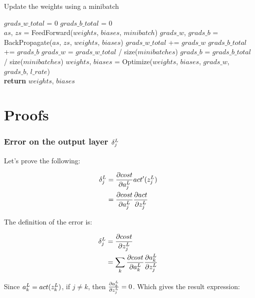 \documentclass[a4paper]{article}
\begin{document}
\begin{algorithm}
  \caption{Update the weights using a minibatch}
  \begin{algorithmic}
      \State $grads\_w\_total$ = $0$
      \State $grads\_b\_total$ = $0$ \\

        \State $as$, $zs$ = FeedForward($weights$, $biases$, $minibatch$)
        \State $grads\_w$, $grads\_b$ = BackPropagate($as$, $zs$, $weights$, $biases$)
        \State $grads\_w\_total$ += $grads\_w$
        \State $grads\_b\_total$ += $grads\_b$
      \EndFor
      \State $grads\_w$ = $grads\_w\_total$ / size($minibatches$)
      \State $grads\_b$ = $grads\_b\_total$ / size($minibatches$)
      \State $weights$, $biases$ = Optimize($weights$, $biases$, $grads\_w$, $grads\_b$, $l\_rate$) \\

      \State \textbf{return} $weights$, $biases$
    \EndProcedure
  \end{algorithmic}
\end{algorithm}

\clearpage
\section{Proofs}

\subsubsection{Error on the output layer $\delta_{j}^{L}$}

Let's prove the following:

\begin{align}
  \delta_{j}^{L} &= \frac{\partial cost}{\partial a_{j}^{L}}act'(z_{j}^{L}) \\
         &= \frac{\partial cost}{\partial a_{j}^{L}} \frac{\partial act}{\partial z_{j}^{L}}
\end{align}

The definition of the error is:

\begin{align}
  \delta_{j}^{L} &= \frac{\partial cost}{\partial z_{j}^{L}} \\
         &= \sum_{k}{\frac{\partial cost}{\partial a_{k}^{L}} \frac{\partial a_{k}^{L}}{\partial z_{j}^{L}}}
\end{align}

Since $a_{k}^{L} = act(z_{k}^{L})$, if $j \neq k$, then $\frac{\partial a_{k}^{L}}{\partial z_{j}^{L}} = 0$.
Which gives the result expression:
\end{document}
